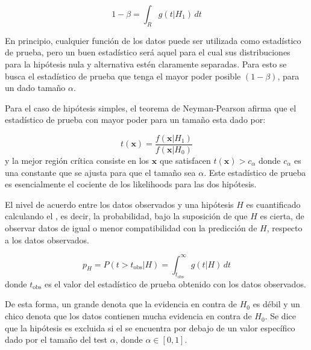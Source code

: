 \begin{equation}
1-\beta = \int_R g(t|H_1)\, dt
\end{equation}

En principio, cualquier función de los datos puede ser utilizada como estadístico
de prueba, pero un buen estadístico será aquel para el cual sus distribuciones
para la hipótesis nula y alternativa estén claramente separadas. Para esto se
busca el estadístico de prueba que tenga el mayor poder posible $(1-\beta)$, para un dado
tama\~no $\alpha$.

Para el caso de hipótesis simples, el teorema de Neyman-Pearson\cite{Neyman289} afirma que el
estadístico de prueba con mayor poder para un tama\~no esta dado por:


\begin{equation}
  t(\bm{x}) = \frac{f(\bm{x}|H_1)}{f(\bm{x}|H_0)}
\end{equation}
%
y la mejor región crítica consiste en los $\bm{x}$ que satisfacen $t(\bm{x}) > c_\alpha$
donde $c_\alpha$ es una constante que se ajusta para que el tama\~no sea $\alpha$.
Este estadístico de prueba es esencialmente el cociente de los likelihoods
para las dos hipótesis.


El nivel de acuerdo entre los datos observados y una hipótesis $H$ es
cuantificado calculando el \emph{\pvalue}, es decir, la probabilidad, bajo la
suposición de que $H$ es cierta, de observar datos de igual o menor
compatibilidad con la predicción de $H$, respecto a los datos observados.

\begin{equation}
  p_H = P(t>t_\text{obs}|H) = \int_{t_\text{obs}}^{\infty} g(t|H) \, dt
\end{equation}
%
donde $t_\text{obs}$ es el valor del estadístico de prueba obtenido con los
datos observados.

De esta forma, un {\pvalue} grande denota que la evidencia en contra de $H_0$ es
débil y un {\pvalue} chico denota que los datos contienen mucha evidencia en
contra de $H_0$.
Se dice que la hipótesis es excluida si el {\pvalue} se encuentra por debajo de un valor
específico dado por el tama\~no del test $\alpha$, donde $\alpha \in [0,1]$.


